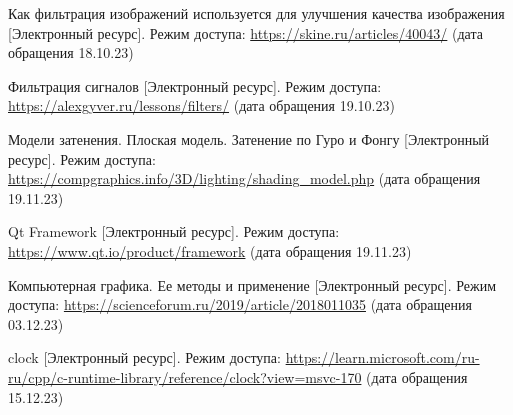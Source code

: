 \begin{thebibliography}{}
	 Как фильтрация изображений используется для улучшения качества изображения [Электронный ресурс]. Режим доступа: \url{https://skine.ru/articles/40043/} (дата обращения 18.10.23)
	
	 Фильтрация сигналов [Электронный ресурс]. Режим доступа: \url{https://alexgyver.ru/lessons/filters/} (дата обращения 19.10.23)
	
	 Модели затенения. Плоская модель. Затенение по Гуро и Фонгу [Электронный ресурс]. Режим доступа: \url{https://compgraphics.info/3D/lighting/shading_model.php} (дата обращения 19.11.23)
	
	 Qt Framework [Электронный ресурс]. Режим доступа: \url{https://www.qt.io/product/framework} (дата обращения 19.11.23)
	
	 Компьютерная графика. Ее методы и применение [Электронный ресурс]. Режим доступа: \url{https://scienceforum.ru/2019/article/2018011035} (дата обращения 03.12.23)
	
	 clock [Электронный ресурс]. Режим доступа: \url{https://learn.microsoft.com/ru-ru/cpp/c-runtime-library/reference/clock?view=msvc-170} (дата обращения 15.12.23)

\end{thebibliography}
